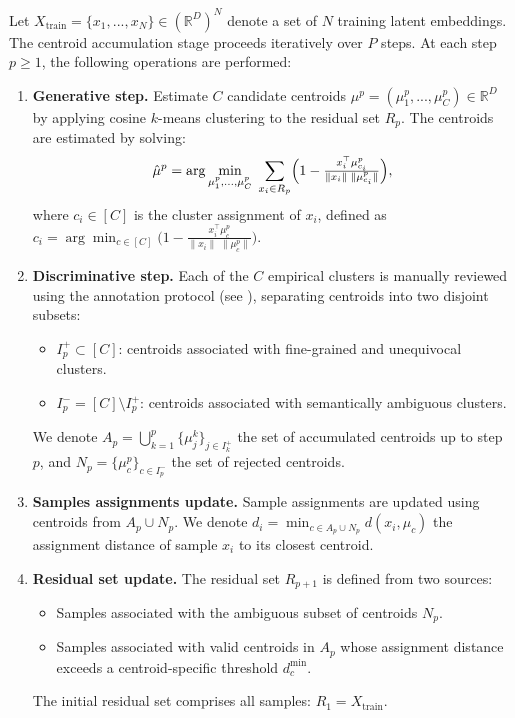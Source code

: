 \documentclass[runningheads]{llncs}
\begin{document}
Let $X_{\text{train}} = \{ x_1, ..., x_N \} \in (\mathbb{R}^{D})^N$ denote a set of $N$ training latent embeddings. The centroid accumulation stage proceeds iteratively over $P$ steps. At each step $p \geq 1$, the following operations are performed:

\begin{enumerate}
    \item \textbf{Generative step.}
    Estimate $C$ candidate centroids $\mu^{p} = (\mu^p_1, ..., \mu^p_C) \in \mathbb{R}^D$ by applying cosine $k$-means clustering to the residual set $R_p$. The centroids are estimated by solving:
    \begin{equation}
        \hat{\mu}^p = \arg \min_{\mu^p_{1},\dots,\mu^p_{C}} \;
        \sum_{x_i \in R_p} \Bigl(1 - \tfrac{x_i^\top \mu^p_{c_i}}{\|x_i\|\;\|\mu^p_{c_i}\|}\Bigr),
    \label{eq:supp_kmeans_objective}
    \end{equation}
    where $c_i \in [C]$ is the cluster assignment of $x_i$, defined as $c_i = \arg \min_{c \in [C]} \bigl(1 - \tfrac{x_i^\top \mu^p_{c}}{\|x_i\|\;\|\mu^p_{c}\|}\bigr)$.

    \item \textbf{Discriminative step.}
    Each of the $C$ empirical clusters is manually reviewed using the annotation protocol (see ), separating centroids into two disjoint subsets:
    \begin{itemize}
        \item $I_p^+ \subset [C]$: centroids associated with fine-grained and unequivocal clusters.
        \item $I_p^- = [C] \setminus I_p^+$: centroids associated with semantically ambiguous clusters.
    \end{itemize}
    We denote $A_p = \bigcup_{k=1}^p \{ \mu^k_j\}_{j\in I_k^+}$ the set of accumulated centroids up to step $p$, and $N_p = \{ \mu^p_c \}_{c \in I_p^-}$ the set of rejected centroids.

    \item \textbf{Samples assignments update.} Sample assignments are updated using centroids from $A_p \cup N_p$. We denote $d_i = \min_{c \in A_p \cup N_p} d(x_i, \mu_c)$ the assignment distance of sample $x_i$ to its closest centroid.

    \item \textbf{Residual set update.} The residual set $R_{p+1}$ is defined from two sources:
    \begin{itemize}
        \item Samples associated with the ambiguous subset of centroids $N_p$.
        \item Samples associated with valid centroids in $A_p$ whose assignment distance exceeds a centroid-specific threshold $d^{\text{min}}_c$.
    \end{itemize}
    The initial residual set comprises all samples: $R_1 = X_{\text{train}}$.
\end{enumerate}
\end{document}

